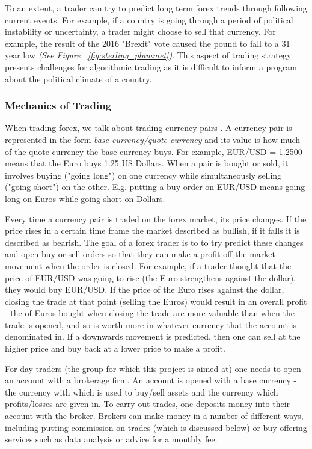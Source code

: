         To an extent, a trader can try to predict long term forex trends through following current events. For example, if a country is going through a period of political instability or uncertainty, a trader might choose to sell that currency. For example, the result of the 2016 "Brexit" vote caused the pound to fall to a 31 year low \cite{bbc_news_2016} \textit{(See Figure ~\ref{fig:sterling_plummet})}. This aspect of trading strategy presents challenges for algorithmic trading as it is difficult to inform a program about the political climate of a country. 



            \subsubsection{Mechanics of Trading}
            When trading forex, we talk about trading currency pairs \cite{hannah_2017}. A currency pair is represented in the form \textit{base currency/quote currency} and its value is how much of the quote currency the base currency buys. For example, EUR/USD = 1.2500 means that the Euro buys 1.25 US Dollars. When a pair is bought or sold, it involves buying ("going long") on one currency while simultaneously selling ("going short") on the other. E.g. putting a buy order on EUR/USD means going long on Euros while going short on Dollars.

            Every time a currency pair is traded on the forex market, its price changes. If the price rises in a certain time frame the market described as bullish, if it falls it is described as bearish. The goal of a forex trader is to to try predict these changes and  open buy or sell orders so that they can make a profit off the market movement when the order is closed. For example, if a trader thought that the price of EUR/USD was going to rise (the Euro strengthens against the dollar), they would buy EUR/USD. If the price of the Euro rises against the dollar, closing the trade at that point (selling the Euros) would result in an overall profit - the of Euros bought when closing the trade are more valuable than when the trade is opened, and so is worth more in whatever currency that the account is denominated in. If a downwards movement is predicted, then one can sell at the higher price and buy back at a lower price to make a profit.

            For day traders (the group for which this project is aimed at) one needs to open an account with a brokerage firm. An account is opened with a base currency - the currency with which is used to buy/sell assets and the currency which profits/losses are given in. To carry out trades, one deposits money into their account with the broker. Brokers can make money in a number of different ways, including putting commission on trades (which is discussed below) or buy offering services such as data analysis or advice for a monthly fee. 


